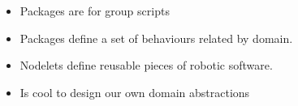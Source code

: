 \documentclass[a4paper,10pt,twoside]{book}
\begin{document}
				\begin{itemize}
					\item Packages are for group scripts
					\item Packages define a set of behaviours related by domain.
					\item Nodelets define reusable pieces of robotic software.
					\item Is cool to design our own domain abstractions
				\end {itemize}

\ifx\wholebook\relax\else
\end{document}
